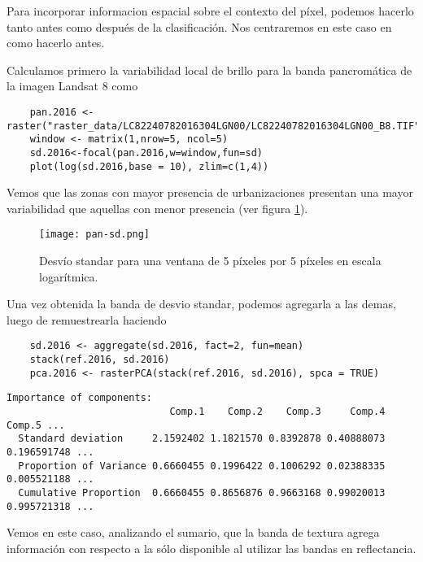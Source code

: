 \begin{exa}
  Para incorporar informacion espacial sobre el contexto del p\'ixel, podemos
  hacerlo tanto antes como despu\'es de la clasificaci\'on. Nos centraremos
  en este caso en como hacerlo antes.

  Calculamos primero la variabilidad local de brillo para la banda pancrom\'atica de la imagen Landsat 8 como

  \begin{lstlisting}
    pan.2016 <- raster("raster_data/LC82240782016304LGN00/LC82240782016304LGN00_B8.TIF")
    window <- matrix(1,nrow=5, ncol=5)
    sd.2016<-focal(pan.2016,w=window,fun=sd)
    plot(log(sd.2016,base = 10), zlim=c(1,4))
  \end{lstlisting}

  Vemos que las zonas con mayor presencia de urbanizaciones presentan una mayor variabilidad que aquellas con menor presencia (ver figura \ref{fig:pansd}).

  \begin{figure}[h!]
    \centering
    \texttt{[image: pan-sd.png]}
    \caption{Desv\'io standar para una ventana de 5 p\'ixeles por 5 p\'ixeles en escala logar\'itmica.}
    \label{fig:pansd}
  \end{figure}

  Una vez obtenida la banda de desvio standar, podemos agregarla a las demas, luego de remuestrearla haciendo

  \begin{lstlisting}
    sd.2016 <- aggregate(sd.2016, fact=2, fun=mean)
    stack(ref.2016, sd.2016)
    pca.2016 <- rasterPCA(stack(ref.2016, sd.2016), spca = TRUE)
  \end{lstlisting}

  \begin{Verbatim}[fontsize=\small]
  Importance of components:
                            Comp.1    Comp.2    Comp.3     Comp.4      Comp.5 ...
  Standard deviation     2.1592402 1.1821570 0.8392878 0.40888073 0.196591748 ...
  Proportion of Variance 0.6660455 0.1996422 0.1006292 0.02388335 0.005521188 ...
  Cumulative Proportion  0.6660455 0.8656876 0.9663168 0.99020013 0.995721318 ...
  \end{Verbatim}

  Vemos en este caso, analizando el sumario, que la banda de textura agrega informaci\'on con respecto a la s\'olo disponible al utilizar las bandas en reflectancia.
\end{exa}

